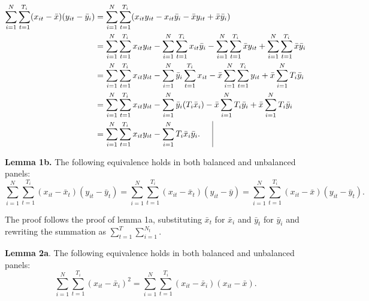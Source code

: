 \documentclass{article}[12pt]
\newenvironment{proof}[1][Proof.]{\begin{trivlist}
\item[\hskip \labelsep {\bfseries #1}]}{\end{trivlist}}
\newcommand{\qed}{\nobreak \ifvmode \relax \else
      \ifdim\lastskip<1.5em \hskip-\lastskip
      \hskip1.5em plus0em minus0.5em \fi \nobreak
      \vrule height0.75em width0.5em depth0.25em\fi}
\begin{document}
\begin{proof}
\begin{align}
\sum_{i=1}^N \sum_{t=1}^{T_i}(x_{it}  - \bar{x})(y_{it}  - \bar{y}_i)  & = \sum_{i=1}^N \sum_{t=1}^{T_i}(x_{it}y_{it} - x_{it}\bar{y}_i  - \bar{x}y_{it}  +\bar{x} \bar{y}_i) \nonumber\\
& = \sum_{i=1}^N \sum_{t=1}^{T_i}x_{it}y_{it} - \sum_{i=1}^N \sum_{t=1}^{T_i}x_{it}\bar{y}_i  - \sum_{i=1}^N \sum_{t=1}^{T_i}\bar{x}y_{it}  + \sum_{i=1}^N \sum_{t=1}^{T_i}\bar{x} \bar{y}_i \nonumber\\
& = \sum_{i=1}^N \sum_{t=1}^{T_i}x_{it}y_{it} - \sum_{i=1}^N \bar{y}_i\sum_{t=1}^{T_i}x_{it}  - \bar{x}\sum_{i=1}^N \sum_{t=1}^{T_i}y_{it}  + \bar{x}\sum_{i=1}^N T_i \bar{y}_i \nonumber\\
& = \sum_{i=1}^N \sum_{t=1}^{T_i}x_{it}y_{it} - \sum_{i=1}^N \bar{y}_i(T_i \bar{x}_i)  - \bar{x}\sum_{i=1}^N T_i\bar{y}_i + \bar{x}\sum_{i=1}^N T_i \bar{y}_i \nonumber\\
& = \sum_{i=1}^N \sum_{t=1}^{T_i}x_{it}y_{it} - \sum_{i=1}^N T_i\bar{x}_i \bar{y}_i.\qed
\end{align}
\end{proof}
\textbf{Lemma 1b.}  The following equivalence holds in both balanced and unbalanced panels:
\begin{equation}
\sum_{i=1}^N \sum_{t=1}^{T_i}(x_{it}  - \bar{x}_t)(y_{it}  - \bar{y}_t) = \sum_{i=1}^N \sum_{t=1}^{T_i}(x_{it}  - \bar{x}_t)(y_{it}  - \bar{y})=\sum_{i=1}^N \sum_{t=1}^{T_i} (x_{it}  - \bar{x})(y_{it}  - \bar{y}_t).
\end{equation}
\begin{proof}
The proof follows the proof of lemma 1a, substituting $\bar{x}_t$ for $\bar{x}_i$ and $\bar{y}_t$ for $\bar{y}_i$ and rewriting the summation as $\sum_{t=1}^{T}\sum_{i=1}^{N_t}$. \qed
\end{proof}
\textbf{Lemma 2a}. The following equivalence holds in both balanced and unbalanced panels:
\begin{equation}
\sum_{i=1}^N \sum_{t=1}^{T_i}(x_{it}  - \bar{x}_i)^2  = \sum_{i=1}^N \sum_{t=1}^{T_i}(x_{it}  - \bar{x}_i)(x_{it}  - \bar{x}).
\end{equation}
\end{document}
